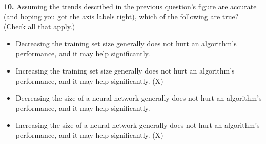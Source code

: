 \textbf{10.} Assuming the trends described in the previous question's figure are accurate (and hoping you got the axis labels right), which of the following are true? (Check all that apply.)
\begin{itemize}
    \item Decreasing the training set size generally does not hurt an algorithm’s performance, and it may help significantly.
    \item Increasing the training set size generally does not hurt an algorithm’s performance, and it may help significantly. (X)
    \item Decreasing the size of a neural network generally does not hurt an algorithm’s performance, and it may help significantly.
    \item Increasing the size of a neural network generally does not hurt an algorithm’s performance, and it may help significantly. (X)
\end{itemize}